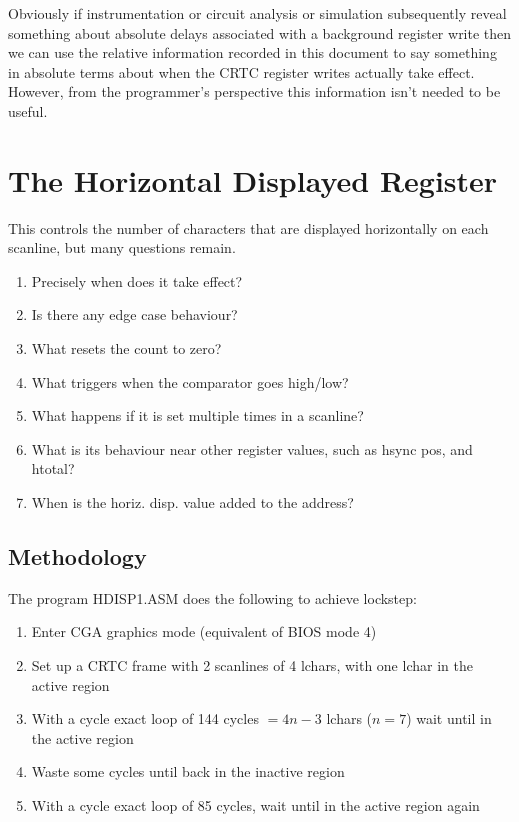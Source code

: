\documentclass[a4paper,10pt]{amsart}
\begin{document}
Obviously if instrumentation or circuit analysis or simulation subsequently
reveal something about absolute delays associated with a background register
write then we can use the relative information recorded in this document to
say something in absolute terms about when the CRTC register writes actually
take effect. However, from the programmer's perspective this information isn't
needed to be useful.

\section{The Horizontal Displayed Register}

This controls the number of characters that are displayed horizontally on each
scanline, but many questions remain.

\begin{enumerate}
\item Precisely when does it take effect?
\item Is there any edge case behaviour?
\item What resets the count to zero?
\item What triggers when the comparator goes high/low?
\item What happens if it is set multiple times in a scanline?
\item What is its behaviour near other register values, such as hsync pos,
      and htotal?
\item When is the horiz. disp. value added to the address?
\end{enumerate}

\subsection{Methodology}

The program HDISP1.ASM does the following to achieve lockstep:

\begin{enumerate}
\item Enter CGA graphics mode (equivalent of BIOS mode 4)
\item Set up a CRTC frame with 2 scanlines of 4 lchars, with one lchar in the active region
\item With a cycle exact loop of 144 cycles $= 4n-3$ lchars ($n = 7$) wait until in the active region
\item Waste some cycles until back in the inactive region
\item With a cycle exact loop of 85 cycles, wait until in the active region again
\end{enumerate}
\end{document}
